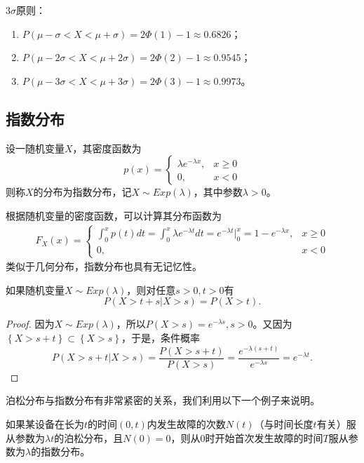   \begin{remark}
  $3\sigma$原则：
      \begin{enumerate}
          \item   $P(\mu -\sigma <X<\mu +\sigma )=2\Phi(1)-1\approx 0.6826$；
          \item 
  $P(\mu -2\sigma <X<\mu +2\sigma )=2\Phi(2)-1\approx 0.9545$；
  \item 
  $P(\mu -3\sigma <X<\mu +3\sigma )=2\Phi(3)-1\approx 0.9973$。
      \end{enumerate}
  \end{remark}  
 
\subsection{指数分布}
\begin{definition}\label{expential_dist}
    设一随机变量$X$，其密度函数为
    $$p(x)=\left\{\begin{matrix}
    \lambda e^{-\lambda x} ,&x\ge 0 \\
    0,&x<0
    \end{matrix}\right.$$
    则称$X$的分布为指数分布，记$X\sim Exp(\lambda)$，其中参数$\lambda>0$。
\end{definition}
根据随机变量的密度函数，可以计算其分布函数为
\begin{eqnarray*}
F_{X} (x) =  \left\{\begin{matrix}
    \int_{0}^{x}p(t)dt=\int_{0}^{x}\lambda e^{-\lambda t} dt= e^{-\lambda t}|_{0}^{x} =1-e^{-\lambda x}  ,&x\ge 0 \\
    0,&x<0
    \end{matrix}\right.
\end{eqnarray*}
类似于几何分布，指数分布也具有无记忆性。
\begin{theorem}[（指数分布的无记忆性）]\label{property:no_memory_expential}
    如果随机变量$X\sim Exp(\lambda)$，则对任意$s>0,t>0$有$$P(X>t+s|X>s)=P(X>t).$$
\end{theorem}
\begin{proof}
因为$X\sim Exp(\lambda)$，所以$P(X>s)=e^{-\lambda s},s>0$。又因为$\left \{ X>s+t \right \} \subset \left \{ X>s \right \} $，于是，条件概率$$P(X>s+t|X>s)=\frac{P(X>s+t)}{P(X>s)}=\frac{e^{-\lambda (s+t)} }{e^{-\lambda s} }=e^{-\lambda t}.$$
    \end{proof}
泊松分布与指数分布有非常紧密的关系，我们利用以下一个例子来说明。
\begin{example}
    如果某设备在长为$t$的时间$(0,t) $内发生故障的次数$N(t)$（与时间长度$t$有关）服从参数为$\lambda t$的泊松分布，且$N(0)=0$，则从$0$时开始首次发生故障的时间$T$服从参数为$\lambda$的指数分布。
\end{example}
